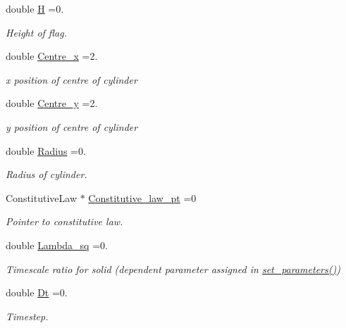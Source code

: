 \begin{DoxyCompactItemize}
double \hyperlink{namespaceGlobal__Parameters_ab360628e7830e43e355ce5768f6d6a6c}{H} =0.
\begin{DoxyCompactList}\small\item\em Height of flag. \end{DoxyCompactList}\item 
double \hyperlink{namespaceGlobal__Parameters_a0f0247cc83ba202413b50e7b4b7fceb0}{Centre\+\_\+x} =2.
\begin{DoxyCompactList}\small\item\em x position of centre of cylinder \end{DoxyCompactList}\item 
double \hyperlink{namespaceGlobal__Parameters_af41282d812fdff4867e3d8c825886290}{Centre\+\_\+y} =2.
\begin{DoxyCompactList}\small\item\em y position of centre of cylinder \end{DoxyCompactList}\item 
double \hyperlink{namespaceGlobal__Parameters_a126c1e491ef187867b6b7bfb52b476ad}{Radius} =0.
\begin{DoxyCompactList}\small\item\em Radius of cylinder. \end{DoxyCompactList}\item 
Constitutive\+Law $\ast$ \hyperlink{namespaceGlobal__Parameters_adbd1f040f375c96fe56b3f475f7dbec2}{Constitutive\+\_\+law\+\_\+pt} =0
\begin{DoxyCompactList}\small\item\em Pointer to constitutive law. \end{DoxyCompactList}\item 
double \hyperlink{namespaceGlobal__Parameters_a3e3428638f89f970fcf2148b0bab1465}{Lambda\+\_\+sq} =0.
\begin{DoxyCompactList}\small\item\em Timescale ratio for solid (dependent parameter assigned in \hyperlink{namespaceGlobal__Parameters_a8c333f9041cad78d5c0160a8e2c169f5}{set\+\_\+parameters()}) \end{DoxyCompactList}\item 
double \hyperlink{namespaceGlobal__Parameters_ab29c9f716872de235c78e62bce2c4109}{Dt} =0.
\begin{DoxyCompactList}\small\item\em Timestep. \end{DoxyCompactList}\item 

\end{DoxyCompactItemize}
